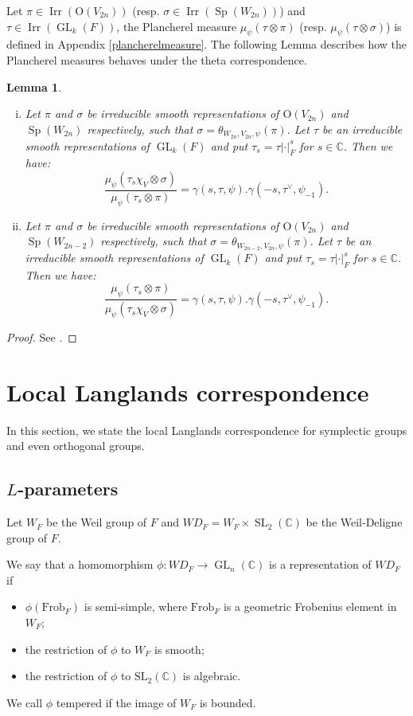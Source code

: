 \documentclass[article]{article}
\numberwithin{equation}{section}
\newtheorem{lemma}[theorem]{Lemma}
\theoremstyle{definition}
\DeclareMathOperator{\GL}{GL}
\DeclareMathOperator{\SL}{SL}
\DeclareMathOperator{\SP}{Sp}
\DeclareMathOperator{\Irr}{Irr}
\begin{document}
Let $\pi\in \Irr(\mathrm O(V_{2n}))$ (resp. $\sigma\in \Irr(\SP(W_{2n}))$) and $\tau\in \Irr(\GL_{k}(F))$, the Plancherel measure $\mu_{\psi}(\tau\otimes\pi)$ (resp. $\mu_{\psi}(\tau\otimes\sigma)$) is defined in Appendix \ref{plancherelmeasure}. The following Lemma describes how the Plancherel measures behaves under the theta correspondence.
\begin{lemma}\label{complan}
	\begin{enumerate}[(i)]
		\item  Let $\pi$ and $\sigma$ be irreducible smooth representations of $\mathrm O(V_{2n})$ and $\SP(W_{2n})$ respectively, such that $\sigma=\theta_{W_{2n},V_{2n},\psi}(\pi)$. Let $\tau$ be an irreducible smooth representations of $\GL_{k}(F)$ and put $\tau_s=\tau|\cdot|_{F}^{s}$ for $s\in \mathbb{C}$. Then we have:
		$$
		\frac{\mu_{\psi}(\tau_s\chi_{V}\otimes\sigma)}{\mu_{\psi}(\tau_s\otimes\pi)}=\gamma(s,\tau,\psi).\gamma(-s,\tau^{\vee},\psi_{-1}).
		$$ 
		\item 
		Let $\pi$ and $\sigma$ be irreducible smooth representations of $\mathrm O(V_{2n})$ and $\SP(W_{2n-2})$ respectively, such that $\sigma=\theta_{W_{2n-2},V_{2n},\psi}(\pi)$. Let $\tau$ be an irreducible smooth representations of $\GL_{k}(F)$ and put $\tau_s=\tau|\cdot|_{F}^{s}$ for $s\in \mathbb{C}$. Then we have:
		$$
		\frac{\mu_{\psi}(\tau_s\otimes\pi)}{\mu_{\psi}(\tau_s\chi_{V}\otimes\sigma)}=\gamma(s,\tau,\psi).\gamma(-s,\tau^{\vee},\psi_{-1}).
		$$ 
	\end{enumerate}
\end{lemma}
\begin{proof}
	See \cite[Theorem 12.1]{MR3166215}. 
\end{proof}






\section{Local Langlands correspondence}
In this section, we state the local Langlands correspondence for symplectic groups and even orthogonal groups. 
\subsection{$L$-parameters}\label{Lparmeter}
Let $W_F$ be the Weil group of $F$ and $WD_F=W_F\times \SL_2(\mathbb C)$ be the Weil-Deligne group of $F$. 

We say that a homomorphism
$\phi : WD_{F} \rightarrow \GL_n(\mathbb C)$ is a representation of $WD_F$ if
\begin{itemize}
	\item $\phi\left(\mathrm{Frob}_{F}\right)$ is semi-simple, where $
	\mathrm{Frob}_{F}$ is a geometric Frobenius element in
	$W_{F}$;
	\item the restriction of $\phi$ to $W_{F}$ is smooth;
	\item  the restriction of $\phi$ to $\mathrm{SL}_{2}(\mathbb{C})$ is algebraic.
\end{itemize}
We call $\phi$ tempered if the image of $W_{F}$ is bounded.
\end{document}
